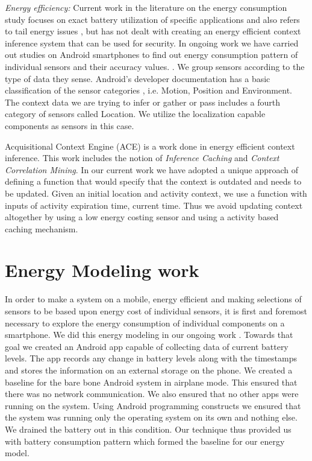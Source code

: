 \documentclass{ubicomp2013}
\begin{document}
{\em Energy efficiency:} Current work in the literature on the energy consumption study focuses on exact battery utilization of specific applications and also refers to tail energy issues \cite{pathak2011finegrainedenergy}, but has not dealt with creating an energy efficient context inference system that can be used for security.  In ongoing work we have carried out studies on Android smartphones to find out energy consumption pattern of individual
sensors and their accuracy values. \cite{das2012energy}. We group sensors according to the type of data they sense. Android's developer documentation has a basic classification of the sensor categories \cite{android2013sesnors}, i.e. Motion, Position and Environment. The context data we are trying to infer or gather or pass includes a fourth category of sensors called Location. We utilize the localization capable components as sensors in this case.

Acquisitional Context Engine (ACE) is a work done in energy efficient context inference. This work includes the notion of {\em Inference Caching} and {\em Context Correlation Mining}. In our current work we have adopted a unique approach of defining a function that would specify that the context is outdated and needs to be updated. Given an initial location and activity context, we use a function with inputs of activity expiration time, current time. Thus we avoid updating context altogether by using a low energy costing sensor and using a activity based caching mechanism.

\section{Energy Modeling work}
In order to make a system on a mobile, energy efficient and making selections of sensors to be based upon energy cost of individual sensors, it is first and foremost necessary to explore the energy consumption of individual components on a smartphone. We did this energy modeling in our ongoing work \cite{das2012energy}. Towards that goal we created an Android app capable of collecting data of current battery levels. The app records any change in battery levels along with the timestamps and stores the information on an external storage on the phone. We created a baseline for the bare bone Android system in airplane mode. This ensured that there was no network communication. We also ensured that no other apps were running on the system. Using Android programming constructs we ensured that the system was running only the operating system on its own and nothing else. We drained the battery out in this condition. Our technique thus provided us with battery consumption pattern which formed the baseline for our energy model.
\end{document}
